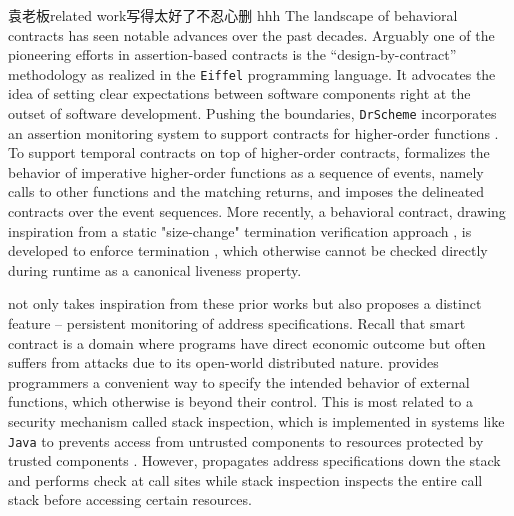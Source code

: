 \iffalse
袁老板related work写得太好了不忍心删 hhh
The landscape of behavioral contracts has seen notable advances over the past decades.
Arguably one of the pioneering efforts in assertion-based contracts is 
the ``design-by-contract'' methodology \cite{DBLP:books/ph/Meyer91, DBLP:conf/tools/Meyer98a} 
as realized in the \texttt{Eiffel} programming language. 
It advocates the idea of setting clear expectations between software components 
right at the outset of software development.
Pushing the boundaries, \texttt{DrScheme} incorporates an assertion monitoring system 
to support contracts for higher-order functions \cite{DBLP:conf/icfp/FindlerF02}.
%
To support temporal contracts on top of higher-order contracts, \citet{DBLP:conf/icfp/DisneyFM11} formalizes the behavior of imperative higher-order functions as a sequence of events, namely calls to other functions and the matching returns, and imposes the delineated contracts over the event sequences.
%
More recently, a behavioral contract, drawing inspiration from a static "size-change" termination verification approach \cite{DBLP:conf/popl/LeeJB01}, is developed to enforce termination \cite{DBLP:conf/pldi/NguyenGTH19}, which otherwise cannot be checked directly during runtime as a canonical liveness property.
%


\lang not only takes inspiration from these prior works but also proposes a distinct feature -- persistent monitoring of address specifications.
Recall that smart contract is a domain where programs have direct economic outcome but often suffers from attacks due to its open-world distributed nature. \lang provides programmers a convenient way to specify the intended behavior of external functions, which otherwise is beyond their control.
%
%
This is most related to a security mechanism called stack inspection, which is implemented in systems like \texttt{Java} to prevents access from untrusted components to resources protected by trusted components \cite{DBLP:conf/popl/FournetG02, DBLP:conf/sp/WallachF98}. 
%
However, \lang propagates address specifications down the stack and performs check at call sites while stack inspection inspects the entire call stack before accessing certain resources.

